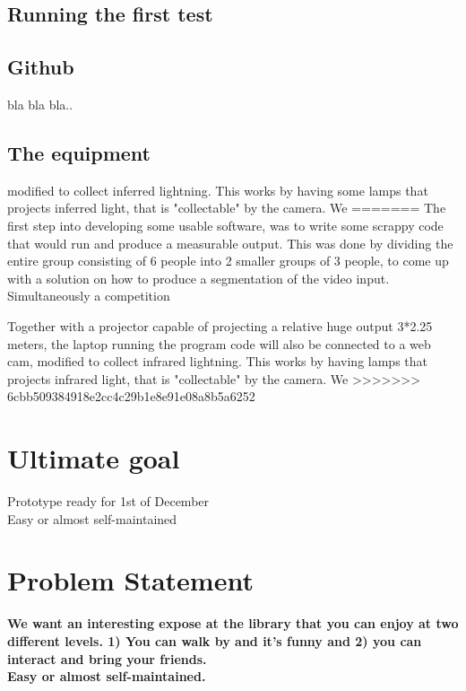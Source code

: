 \subsection{Running the first test}


\subsection{Github}
bla bla bla..

\subsection{The equipment} 
modified to collect inferred lightning. This works by having some lamps that projects inferred light, that is "collectable" by the camera. We 
=======
The first step into developing some usable software, was to write some scrappy  code that would run and produce a measurable  output. This was done by dividing the entire group consisting of 6 people into 2 smaller groups of 3 people, to come up with a solution on how to produce a segmentation of the video input. Simultaneously a competition

Together with a projector capable of projecting a relative huge output 3*2.25 meters, the laptop running the program code will also be connected to a web cam, modified to collect infrared lightning. This works by having  lamps that projects infrared light, that is "collectable" by the camera. We 
>>>>>>> 6cbb509384918e2cc4c29b1e8e91e08a8b5a6252

\section{Ultimate goal}
Prototype ready for 1st of December\\
Easy or almost self-maintained
\section{Problem Statement}
      
\textbf{We want an interesting expose at the library that you can enjoy at two different levels. 1) You can walk by and it's funny and 2) you can interact and bring your friends.}\\
\textbf{Easy or almost self-maintained.}

